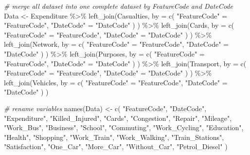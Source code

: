 \documentclass[
]{article}
\newenvironment{Shaded}{\begin{snugshade}}{\end{snugshade}}
\newcommand{\AttributeTok}[1]{\textcolor[rgb]{0.77,0.63,0.00}{#1}}
\newcommand{\CommentTok}[1]{\textcolor[rgb]{0.56,0.35,0.01}{\textit{#1}}}
\newcommand{\FunctionTok}[1]{\textcolor[rgb]{0.00,0.00,0.00}{#1}}
\newcommand{\NormalTok}[1]{#1}
\newcommand{\OtherTok}[1]{\textcolor[rgb]{0.56,0.35,0.01}{#1}}
\newcommand{\SpecialCharTok}[1]{\textcolor[rgb]{0.00,0.00,0.00}{#1}}
\newcommand{\StringTok}[1]{\textcolor[rgb]{0.31,0.60,0.02}{#1}}
\begin{document}
\begin{Shaded}
\begin{Highlighting}[]
\CommentTok{\# merge all dataset into one complete dataset by \textquotesingle{}FeatureCode\textquotesingle{} and \textquotesingle{}DateCode\textquotesingle{}}
\NormalTok{Data }\OtherTok{\textless{}{-}}\NormalTok{ Expenditure }\SpecialCharTok{\%\textgreater{}\%}
  \FunctionTok{left\_join}\NormalTok{(Casualties,}
    \AttributeTok{by =} \FunctionTok{c}\NormalTok{(}
      \StringTok{"FeatureCode"} \OtherTok{=} \StringTok{"FeatureCode"}\NormalTok{,}
      \StringTok{"DateCode"} \OtherTok{=} \StringTok{"DateCode"}
\NormalTok{    )}
\NormalTok{  ) }\SpecialCharTok{\%\textgreater{}\%}
  \FunctionTok{left\_join}\NormalTok{(Cards,}
    \AttributeTok{by =} \FunctionTok{c}\NormalTok{(}
      \StringTok{"FeatureCode"} \OtherTok{=} \StringTok{"FeatureCode"}\NormalTok{,}
      \StringTok{"DateCode"} \OtherTok{=} \StringTok{"DateCode"}
\NormalTok{    )}
\NormalTok{  ) }\SpecialCharTok{\%\textgreater{}\%}
  \FunctionTok{left\_join}\NormalTok{(Network,}
    \AttributeTok{by =} \FunctionTok{c}\NormalTok{(}
      \StringTok{"FeatureCode"} \OtherTok{=} \StringTok{"FeatureCode"}\NormalTok{,}
      \StringTok{"DateCode"} \OtherTok{=} \StringTok{"DateCode"}
\NormalTok{    )}
\NormalTok{  ) }\SpecialCharTok{\%\textgreater{}\%}
  \FunctionTok{left\_join}\NormalTok{(Purposes,}
    \AttributeTok{by =} \FunctionTok{c}\NormalTok{(}
      \StringTok{"FeatureCode"} \OtherTok{=} \StringTok{"FeatureCode"}\NormalTok{,}
      \StringTok{"DateCode"} \OtherTok{=} \StringTok{"DateCode"}
\NormalTok{    )}
\NormalTok{  ) }\SpecialCharTok{\%\textgreater{}\%}
  \FunctionTok{left\_join}\NormalTok{(Transport,}
    \AttributeTok{by =} \FunctionTok{c}\NormalTok{(}
      \StringTok{"FeatureCode"} \OtherTok{=} \StringTok{"FeatureCode"}\NormalTok{,}
      \StringTok{"DateCode"} \OtherTok{=} \StringTok{"DateCode"}
\NormalTok{    )}
\NormalTok{  ) }\SpecialCharTok{\%\textgreater{}\%}
  \FunctionTok{left\_join}\NormalTok{(Vehicles,}
    \AttributeTok{by =} \FunctionTok{c}\NormalTok{(}
      \StringTok{"FeatureCode"} \OtherTok{=} \StringTok{"FeatureCode"}\NormalTok{,}
      \StringTok{"DateCode"} \OtherTok{=} \StringTok{"DateCode"}
\NormalTok{    )}
\NormalTok{  )}

\CommentTok{\# rename variables}
\FunctionTok{names}\NormalTok{(Data) }\OtherTok{\textless{}{-}} \FunctionTok{c}\NormalTok{(}
  \StringTok{"FeatureCode"}\NormalTok{, }\StringTok{"DateCode"}\NormalTok{, }\StringTok{"Expenditure"}\NormalTok{, }\StringTok{"Killed\_Injured"}\NormalTok{,}
  \StringTok{"Cards"}\NormalTok{, }\StringTok{"Congestion"}\NormalTok{, }\StringTok{"Repair"}\NormalTok{, }\StringTok{"Mileage"}\NormalTok{, }\StringTok{"Work\_Bus"}\NormalTok{,}
  \StringTok{"Business"}\NormalTok{, }\StringTok{"School"}\NormalTok{, }\StringTok{"Commuting"}\NormalTok{, }\StringTok{"Work\_Cycling"}\NormalTok{, }\StringTok{"Education"}\NormalTok{,}
  \StringTok{"Health"}\NormalTok{, }\StringTok{"Shopping"}\NormalTok{, }\StringTok{"Work\_Train"}\NormalTok{, }\StringTok{"Work\_Walking"}\NormalTok{, }\StringTok{"Train\_Stations"}\NormalTok{,}
  \StringTok{"Satisfaction"}\NormalTok{, }\StringTok{"One\_Car"}\NormalTok{, }\StringTok{"More\_Car"}\NormalTok{, }\StringTok{"Without\_Car"}\NormalTok{, }\StringTok{"Petrol\_Diesel"}
\NormalTok{)}


\end{Highlighting}
\end{Shaded}
\end{document}
